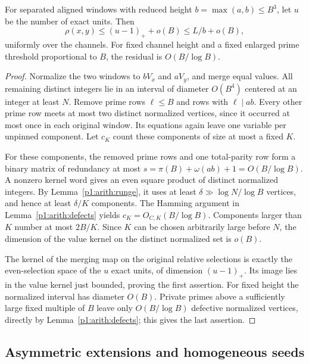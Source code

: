 \begin{lemma}\label{p1:arith:alignedrank}
For separated aligned windows with reduced height
$b=\max(a,b)\leq B^3$, let $u$ be the number of exact units.  Then
\[
 \rho(x,y)\leq(u-1)_++o(B)\leq L/b+o(B),
\]
uniformly over the channels.  For fixed channel height and a fixed enlarged
prime threshold proportional to $B$, the residual is $O(B/\log B)$.
\end{lemma}

\begin{proof}
Normalize the two windows to $bV_x$ and $aV_y$, and merge equal values.
All remaining distinct integers lie in an interval of diameter $O(B^4)$
centered at an integer at least $N$.  Remove prime rows $\ell\leq B$
and rows with $\ell\mid ab$.  Every other prime row meets at most two
distinct normalized vertices, since it occurred at most once in each
original window.  Its equations again leave one variable per unpinned
component.  Let $c_K$ count these components of size at most a fixed $K$.

For these components, the removed prime rows and one total-parity row
form a binary matrix of redundancy at most
$s=\pi(B)+\omega(ab)+1=O(B/\log B)$.  A nonzero kernel word gives
an even square product of distinct normalized integers.  By
Lemma~\ref{p1:arith:runge}, it uses at least
$\delta\gg\log N/\log B$ vertices, and hence at least $\delta/K$
components.  The Hamming argument in Lemma~\ref{p1:arith:defects} yields
$c_K=O_{C,K}(B/\log B)$.  Components larger than $K$ number at most
$2B/K$.  Since $K$ can be chosen arbitrarily large before $N$, the
dimension of the value kernel on the distinct normalized set is $o(B)$.

The kernel of the merging map on the original relative selections is
exactly the even-selection space of the $u$ exact units, of dimension
$(u-1)_+$.  Its image lies in the value kernel just bounded, proving
the first assertion.  For fixed height the normalized interval has
diameter $O(B)$.  Private primes above a sufficiently large fixed multiple
of $B$ leave only $O(B/\log B)$ defective normalized vertices, directly
by Lemma~\ref{p1:arith:defects}; this gives the last assertion.
\end{proof}

\subsection{Asymmetric extensions and homogeneous seeds}

